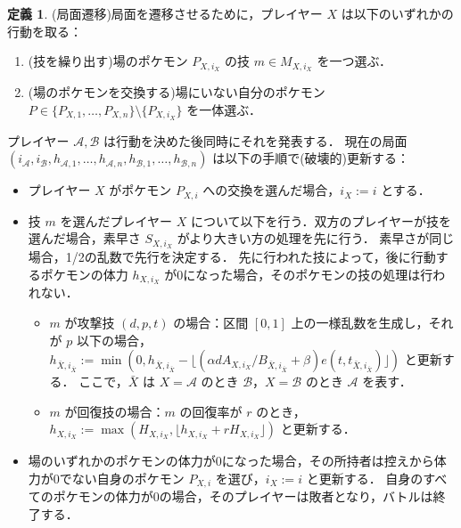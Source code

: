 \documentclass{jsarticle}
\theoremstyle{definition}
\newtheorem{definition}{定義}
\begin{document}
\begin{definition}
(局面遷移)局面を遷移させるために，プレイヤー $X$ は以下のいずれかの行動を取る：
\begin{enumerate}
	\item (技を繰り出す)場のポケモン $P_{X,i_X}$ の技 $m\in M_{X,i_X}$ を一つ選ぶ．
	\item (場のポケモンを交換する)場にいない自分のポケモン $P\in \{P_{X,1},\dots,P_{X,n}\}\setminus\{P_{X,i_X}\}$ を一体選ぶ．
\end{enumerate}
プレイヤー $\mathcal A,\mathcal B$ は行動を決めた後同時にそれを発表する．
現在の局面 $(i_\mathcal A,i_\mathcal B,h_{\mathcal A,1},\dots,h_{\mathcal A,n},h_{\mathcal B,1},\dots,h_{\mathcal B,n})$ は以下の手順で(破壊的)更新する：
\begin{itemize}
	\item プレイヤー $X$ がポケモン $P_{X,i}$ への交換を選んだ場合，$i_X := i$ とする．
	\item 技 $m$ を選んだプレイヤー $X$ について以下を行う．双方のプレイヤーが技を選んだ場合，素早さ $S_{X,i_X}$ がより大きい方の処理を先に行う．
素早さが同じ場合，1/2の乱数で先行を決定する．
先に行われた技によって，後に行動するポケモンの体力 $h_{X,i_X}$ が0になった場合，そのポケモンの技の処理は行われない．
	\begin{itemize}
		\item $m$ が攻撃技 $(d,p,t)$ の場合：区間 $[0,1]$ 上の一様乱数を生成し，それが $p$ 以下の場合，$h_{\bar X,i_{\bar X}} := \min(0,h_{\bar X,i_{\bar X}} - \lfloor(\alpha dA_{X,i_X}/B_{\bar X,i_{\bar X}} + \beta)e(t,t_{\bar X,i_{\bar X}}) \rfloor)$ と更新する．
ここで，$\bar X$ は $X=\mathcal A$ のとき $\mathcal B$，$X=\mathcal B$ のとき $\mathcal A$ を表す．
		\item $m$ が回復技の場合：$m$ の回復率が $r$ のとき，$h_{X,i_X} := \max(H_{X,i_X},\lfloor h_{X,i_X} + rH_{X,i_X}\rfloor)$ と更新する．
	\end{itemize}
	\item 場のいずれかのポケモンの体力が0になった場合，その所持者は控えから体力が0でない自身のポケモン $P_{X,i}$ を選び，$i_X := i$ と更新する．
自身のすべてのポケモンの体力が0の場合，そのプレイヤーは敗者となり，バトルは終了する．
\end{itemize}
\end{definition}
\end{document}
